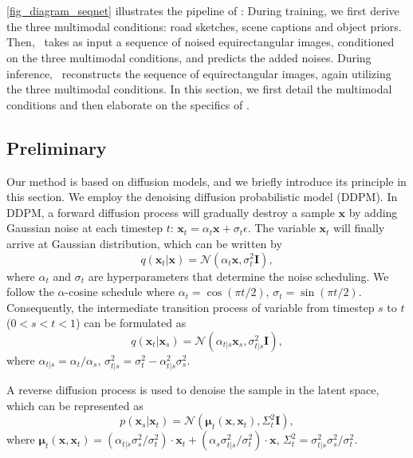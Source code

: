 \section{\sysname}

\label{sec_seqlidar}

\cref{fig_diagram_seqnet} illustrates the pipeline of \sysname: During training, we first derive the three multimodal conditions: road sketches, scene captions and object priors. Then, \modelname\ takes as input a sequence of noised equirectangular images, conditioned on the three multimodal conditions, and predicts the added noises. During inference, \modelname\ reconstructs the sequence of equirectangular images, again utilizing the three multimodal conditions.
In this section, we first detail the multimodal conditions and then elaborate on the specifics of \modelname.

\subsection{Preliminary}
Our method is based on diffusion models, and we briefly introduce its principle in this section. We employ the denoising diffusion probabilistic model (DDPM). In DDPM, a forward diffusion process will gradually destroy a sample $\boldsymbol{x}$ by adding Gaussian noise at each timestep $t$: $\boldsymbol{x}_t=\alpha_t \boldsymbol{x} + \sigma_t \epsilon$. The variable $\boldsymbol{x}_t$ will finally arrive at Gaussian distribution, which can be written by
\begin{equation}
    q(\boldsymbol{x}_t|\boldsymbol{x}) = \mathcal{N} (\alpha_t\boldsymbol{x}, \sigma^2_t \boldsymbol{I}), 
\end{equation}
where $\alpha_t$ and $\sigma_t$ are hyperparameters that determine the noise scheduling. We follow the $\alpha$-cosine schedule \cite{saharia2022photorealistic} where $\alpha_t=\cos(\pi t/2)$, $\sigma_t=\sin(\pi t/2)$. Consequently, the intermediate transition process of variable from timestep $s$ to $t$ ($0<s<t<1$) can be formulated as 
\begin{equation}
    q(\boldsymbol{x}_t|\boldsymbol{x}_s)= \mathcal{N} (\alpha_{t|s}\boldsymbol{x}_s, \sigma^2_{t|s} \boldsymbol{I}), 
\end{equation}
where $\alpha_{t|s}={\alpha_t}/{\alpha_s}$, $\sigma^2_{t|s}=\sigma^2_t - \alpha^2_{t|s}\sigma^2_s$.

A reverse diffusion process is used to denoise the sample in the latent space, which can be represented as
\begin{equation}
\label{eq_p_step}
    p(\boldsymbol{x}_s|\boldsymbol{x}_t) = \mathcal{N}(\boldsymbol{\mu}_t(\boldsymbol{x}, \boldsymbol{x}_t), \Sigma^2_t\boldsymbol{I}),
\end{equation}
where $\boldsymbol{\mu}_t(\boldsymbol{x}, \boldsymbol{x}_t)=(\alpha_{t|s}\sigma^2_s/\sigma^2_t) \cdot \boldsymbol{x}_t + (\alpha_s\sigma^2_{t|s}/\sigma^2_t) \cdot \boldsymbol{x}$, $\Sigma^2_t=\sigma^2_{t|s}\sigma^2_s/\sigma^2_t$.

